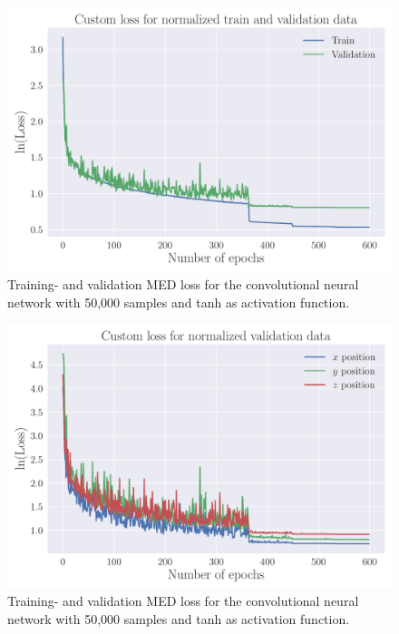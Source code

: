 \documentclass[a4paper, UKenglish, 11pt]{uiomaster}
\begin{document}
\begin{figure}[!htb]
    \centering
    \includegraphics[width=\linewidth]{figures/CNN/Custom_Loss_simple_last_run_old_std_cnn_32_0.001_0.35_0.5_0_600_(0).pdf}
    \caption{Training- and validation MED loss for the convolutional neural network with 50,000 samples and tanh as activation function.}
    \label{fig:accuracy_CNN}
\end{figure}

\begin{figure}[!htb]
    \centering
    \includegraphics[width=\linewidth]{figures/CNN/Custom_Loss_mse_targets_simple_last_run_old_std_cnn_32_0.001_0.35_0.5_0_600_(0).pdf}
    \caption{Training- and validation MED loss for the convolutional neural network with 50,000 samples and tanh as activation function.}
    \label{fig:accuracy_CNN_targets}
\end{figure}
\end{document}
